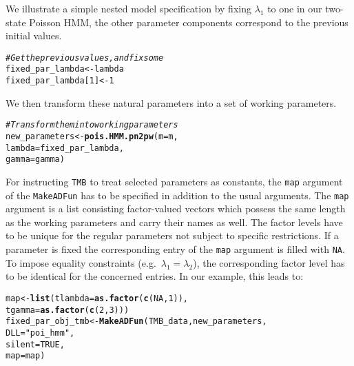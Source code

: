 \documentclass[bimj,fleqn]{w-art}\usepackage[]{graphicx}\usepackage[]{color}
\makeatletter
\newcommand{\hlnum}[1]{\textcolor[rgb]{0.686,0.059,0.569}{#1}}%
\newcommand{\hlstr}[1]{\textcolor[rgb]{0.192,0.494,0.8}{#1}}%
\newcommand{\hlcom}[1]{\textcolor[rgb]{0.678,0.584,0.686}{\textit{#1}}}%
\newcommand{\hlstd}[1]{\textcolor[rgb]{0.345,0.345,0.345}{#1}}%
\newcommand{\hlkwb}[1]{\textcolor[rgb]{0.69,0.353,0.396}{#1}}%
\newcommand{\hlkwc}[1]{\textcolor[rgb]{0.333,0.667,0.333}{#1}}%
\newcommand{\hlkwd}[1]{\textcolor[rgb]{0.737,0.353,0.396}{\textbf{#1}}}%
\newenvironment{kframe}{%
 \def\at@end@of@kframe{}%
 \ifinner\ifhmode%
  \def\at@end@of@kframe{\end{minipage}}%
  \begin{minipage}{\columnwidth}%
 \fi\fi%
 \def\FrameCommand##1{\hskip\@totalleftmargin \hskip-\fboxsep
 \colorbox{shadecolor}{##1}\hskip-\fboxsep
     \hskip-\linewidth \hskip-\@totalleftmargin \hskip\columnwidth}%
 \MakeFramed {\advance\hsize-\width
   \@totalleftmargin\z@ \linewidth\hsize
   \@setminipage}}%
 {\par\unskip\endMakeFramed%
 \at@end@of@kframe}
\newenvironment{knitrout}{}{} %
\theoremstyle{plain}
\theoremstyle{definition}
\makeatother
\begin{document}
We illustrate a simple nested model specification by fixing $\lambda_1$ to one in our two-state Poisson HMM, the other parameter components correspond to the previous initial values. 
\begin{knitrout}
\color{fgcolor}\begin{kframe}
\begin{alltt}
\hlcom{# Get the previous values, and fix some}
\hlstd{fixed_par_lambda} \hlkwb{<-} \hlstd{lambda}
\hlstd{fixed_par_lambda[}\hlnum{1}\hlstd{]} \hlkwb{<-} \hlnum{1}
\end{alltt}
\end{kframe}
\end{knitrout}
We then transform these natural parameters into a set of working parameters.
\begin{knitrout}
\color{fgcolor}\begin{kframe}
\begin{alltt}
\hlcom{# Transform them into working parameters}
\hlstd{new_parameters} \hlkwb{<-} \hlkwd{pois.HMM.pn2pw}\hlstd{(}\hlkwc{m} \hlstd{= m,}
                                 \hlkwc{lambda} \hlstd{= fixed_par_lambda,}
                                 \hlkwc{gamma} \hlstd{= gamma)}
\end{alltt}
\end{kframe}
\end{knitrout}
For instructing {\tt{TMB}} to treat selected parameters as constants, the \texttt{map} argument of the \texttt{MakeADFun} has to be specified in addition to the usual arguments. The \texttt{map} argument is a list consisting factor-valued vectors which possess the same length as the working parameters and carry their names as well. 
The factor levels have to be unique for the regular parameters not subject to specific restrictions. If a parameter is fixed the corresponding entry of the \texttt{map} argument is filled with \texttt{NA}. To impose equality constraints (e.g.~$\lambda_1 = \lambda_2$), the corresponding factor level has to be identical for the concerned entries. In our example, this leads to:
\begin{knitrout}
\color{fgcolor}\begin{kframe}
\begin{alltt}
\hlstd{map} \hlkwb{<-} \hlkwd{list}\hlstd{(}\hlkwc{tlambda} \hlstd{=} \hlkwd{as.factor}\hlstd{(}\hlkwd{c}\hlstd{(}\hlnum{NA}\hlstd{,} \hlnum{1}\hlstd{)),}
            \hlkwc{tgamma} \hlstd{=} \hlkwd{as.factor}\hlstd{(}\hlkwd{c}\hlstd{(}\hlnum{2}\hlstd{,} \hlnum{3}\hlstd{)))}
\hlstd{fixed_par_obj_tmb} \hlkwb{<-} \hlkwd{MakeADFun}\hlstd{(TMB_data, new_parameters,}
                               \hlkwc{DLL} \hlstd{=} \hlstr{"poi_hmm"}\hlstd{,}
                               \hlkwc{silent} \hlstd{=} \hlnum{TRUE}\hlstd{,}
                               \hlkwc{map} \hlstd{= map)}
\end{alltt}
\end{kframe}
\end{knitrout}
\end{document}
